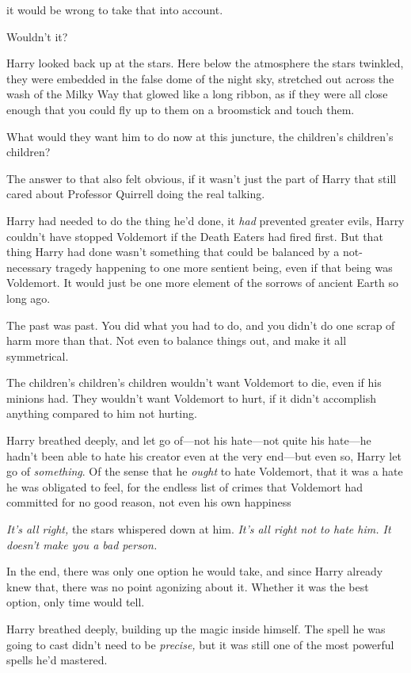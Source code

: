 {\el}it would be wrong to take that into account.

Wouldn't it?

Harry looked back up at the stars. Here below the atmosphere the stars
twinkled, they were embedded in the false dome of the night sky, stretched out
across the wash of the Milky Way that glowed like a long ribbon, as if they
were all close enough that you could fly up to them on a broomstick and touch
them.

What would they want him to do now at this juncture, the children's children's
children?

The answer to that also felt obvious, if it wasn't just the part of Harry that
still cared about Professor Quirrell doing the real talking.

Harry had needed to do the thing he'd done, it \emph{had} prevented greater
evils, Harry couldn't have stopped Voldemort if the Death Eaters had fired
first. But that thing Harry had done wasn't something that could be balanced by
a not-necessary tragedy happening to one more sentient being, even if that
being was Voldemort. It would just be one more element of the sorrows of
ancient Earth so long ago.

The past was past. You did what you had to do, and you didn't do one scrap of
harm more than that. Not even to balance things out, and make it all
symmetrical.

The children's children's children wouldn't want Voldemort to die, even if his
minions had. They wouldn't want Voldemort to hurt, if it didn't accomplish
anything compared to him not hurting.

Harry breathed deeply, and let go of—not his hate—not quite his hate—he
hadn't been able to hate his creator even at the very end—but even so, Harry
let go of \emph{something}. Of the sense that he \emph{ought} to hate
Voldemort, that it was a hate he was obligated to feel, for the endless list of
crimes that Voldemort had committed for no good reason, not even his own
happiness{\el}

\emph{It's all right,} the stars whispered down at him. \emph{It's all right
not to hate him. It doesn't make you a bad person.}

In the end, there was only one option he would take, and since Harry already
knew that, there was no point agonizing about it. Whether it was the best
option, only time would tell.

Harry breathed deeply, building up the magic inside himself. The spell he was
going to cast didn't need to be \emph{precise,} but it was still one of the
most powerful spells he'd mastered.


